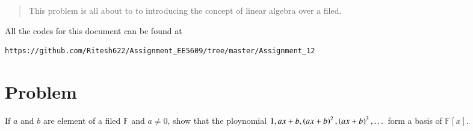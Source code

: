 \documentclass[journal,12pt,twocolumn]{IEEEtran}
\begin{document}
	
	\maketitle
	\newpage
	\bigskip
	\renewcommand{\thefigure}{\theenumi}
	\renewcommand{\thetable}{\theenumi}
	\date{Today}
	

\begin{abstract}
This problem is all about to to introducing the concept of linear algebra over a filed.
\end{abstract}
All the codes for this document can be found at
\begin{lstlisting}
https://github.com/Ritesh622/Assignment_EE5609/tree/master/Assignment_12
\end{lstlisting}
\section{Problem}
If $a$ and $b$ are element of a filed $\mathbb{F}$ and $ a \neq 0$, show that the ploynomial $ 1, ax+b, \left(ax+b\right)^2, \left(ax+b\right)^3,  \dots $ form a basis of $\mathbb{F}[x].$
\end{document}
